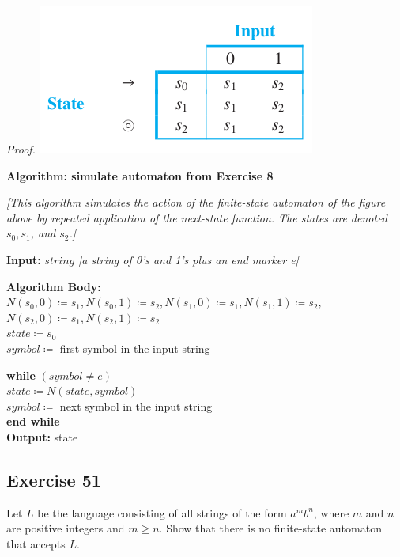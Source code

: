 \documentclass[14pt]{extarticle}
\newcommand{\cy}{\color{cyan}}
\begin{document}
{\it Proof.}
\includegraphics[scale=0.5]{../images/12.2.8.png}

\begin{tcolorbox}[colframe=cyan]
{\bf \cy Algorithm: simulate automaton from Exercise 8}

{\it [This algorithm simulates the action of the finite-state automaton of the figure above by repeated application of the 
next-state function. The states are denoted \(s_0, s_1\), and \(s_2\).]}

{\bf Input:} \(string\) {\it [a string of 0’s and 1’s plus an end marker e]}

{\bf Algorithm Body:} \\
\(N(s_0, 0) \coloneqq s_1, N(s_0, 1) \coloneqq s_2, N(s_1, 0) \coloneqq s_1, N(s_1, 1) \coloneqq s_2,\) \\
\(N(s_2, 0) \coloneqq s_1, N(s_2, 1) \coloneqq s_2\) \\
\(state \coloneqq s_0\) \\
\(symbol \coloneqq\) first symbol in the input string

\begin{tabbing}
{\bf while} \= \((symbol \neq e)\) \\
            \> \(state \coloneqq N(state, symbol)\) \\
            \> \(symbol \coloneqq\) next symbol in the input string \\
{\bf end while} \\
{\bf Output:} state
\end{tabbing}
\end{tcolorbox}

\subsection{Exercise 51}
Let \(L\) be the language consisting of all strings of the form \(a^mb^n\), where \(m\) and \(n\) are positive integers 
and \(m \geq n\). Show that there is no finite-state automaton that accepts \(L\).
\end{document}

